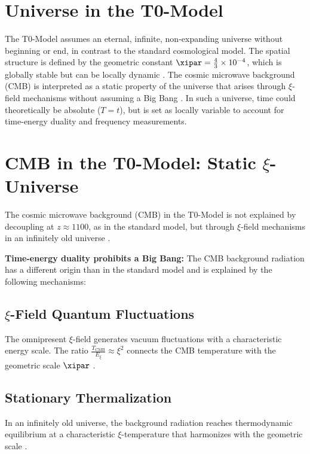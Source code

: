 \section{Universe in the T0-Model}
\label{sec:universe}

The T0-Model assumes an eternal, infinite, non-expanding universe without beginning or end, in contrast to the standard cosmological model. The spatial structure is defined by the geometric constant \(\xipar = \frac{4}{3} \times 10^{-4}\), which is globally stable but can be locally dynamic \cite{pascher_t0_energy_2025}. The cosmic microwave background (CMB) is interpreted as a static property of the universe that arises through \(\xi\)-field mechanisms without assuming a Big Bang \cite{pascher_t0_cmb_2025}. In such a universe, time could theoretically be absolute (\( T = t \)), but is set as locally variable to account for time-energy duality and frequency measurements.

\section{CMB in the T0-Model: Static \(\xi\)-Universe}
\label{sec:cmb}

The cosmic microwave background (CMB) in the T0-Model is not explained by decoupling at \( z \approx 1100 \), as in the standard model, but through \(\xi\)-field mechanisms in an infinitely old universe \cite{pascher_t0_cmb_2025}.

\textbf{Time-energy duality prohibits a Big Bang:} The CMB background radiation has a different origin than in the standard model and is explained by the following mechanisms:

\subsection{\(\xi\)-Field Quantum Fluctuations}
\label{subsec:xi-fluctuations}

The omnipresent \(\xi\)-field generates vacuum fluctuations with a characteristic energy scale. The ratio \( \frac{T_{\text{CMB}}}{E_\xi} \approx \xi^2 \) connects the CMB temperature with the geometric scale \(\xipar\) \cite{pascher_t0_cmb_2025}.

\subsection{Stationary Thermalization}
\label{subsec:thermalization}

In an infinitely old universe, the background radiation reaches thermodynamic equilibrium at a characteristic \(\xi\)-temperature that harmonizes with the geometric scale \cite{pascher_t0_cmb_2025}.

